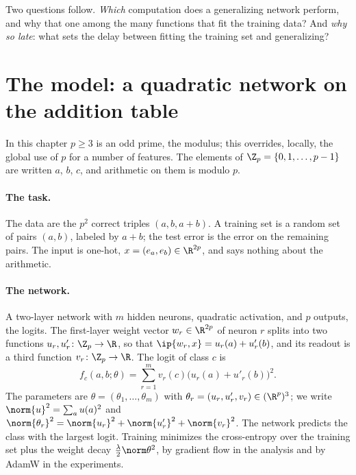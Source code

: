 \begin{refsection}
Two questions follow. \emph{Which} computation does a generalizing network perform, and why that one among the many functions that fit the training data? And \emph{why so late}: what sets the delay between fitting the training set and generalizing?

\section{The model: a quadratic network on the addition table}\label{sec:grokking:model}

In this chapter $p\ge3$ is an odd prime, the modulus; this overrides, locally, the global use of $p$ for a number of features. The elements of $\grokZp=\{0,1,\dots,p-1\}$ are written $a$, $b$, $c$, and arithmetic on them is modulo $p$.

\paragraph{The task.} The data are the $p^2$ correct triples $(a,b,a+b)$. A training set is a random set of pairs $(a,b)$, labeled by $a+b$; the test error is the error on the remaining pairs. The input is one-hot, $x=(e_a,e_b)\in\R^{2p}$, and says nothing about the arithmetic.

\paragraph{The network.} A two-layer network with $m$ hidden neurons, quadratic activation, and $p$ outputs, the logits. The first-layer weight vector $w_r\in\R^{2p}$ of neuron $r$ splits into two functions $u_r,u'_r\colon\grokZp\to\R$, so that $\ip{w_r,x}=u_r(a)+u'_r(b)$, and its readout is a third function $v_r\colon\grokZp\to\R$. The logit of class $c$ is
\begin{equation}\label{eq:grokking:net}
  f_c(a,b;\theta)=\sum_{r=1}^m v_r(c)\bigl(u_r(a)+u'_r(b)\bigr)^2 .
\end{equation}
The parameters are $\theta=(\theta_1,\dots,\theta_m)$ with $\theta_r=(u_r,u'_r,v_r)\in(\R^p)^3$; we write $\norm{u}^2=\sum_au(a)^2$ and $\norm{\theta_r}^2=\norm{u_r}^2+\norm{u'_r}^2+\norm{v_r}^2$. The network predicts the class with the largest logit. Training minimizes the cross-entropy over the training set plus the weight decay $\frac\lambda2\norm\theta^2$, by gradient flow in the analysis and by AdamW in the experiments.


\end{refsection}
